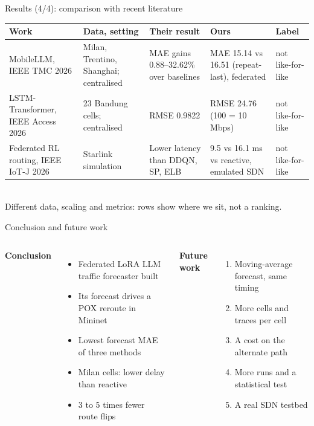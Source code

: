 \documentclass[11pt,aspectratio=169]{beamer}
\begin{document}
\begin{frame}{Results (4/4): comparison with recent literature}
  \footnotesize
  \setlength\tabcolsep{3pt}\renewcommand{\arraystretch}{1.2}
  \begin{tabular}{@{}>{\raggedright}p{2.7cm}>{\raggedright}p{2.8cm}>{\raggedright}p{2.8cm}>{\raggedright}p{3.0cm}>{\raggedright\arraybackslash}p{1.6cm}@{}}
    \toprule
    Work & Data, setting & Their result & Ours & Label\tabularnewline \midrule
    MobileLLM, IEEE TMC 2026 \cite{wang2026mobilellm} & Milan, Trentino, Shanghai; centralised & MAE gains 0.88--32.62\% over baselines & MAE 15.14 vs 16.51 (repeat-last), federated & not like-for-like\tabularnewline
    LSTM-Transformer, IEEE Access 2026 \cite{yuliana2026hybrid} & 23 Bandung cells; centralised & RMSE 0.9822 & RMSE 24.76 (100 = 10 Mbps) & not like-for-like\tabularnewline
    Federated RL routing, IEEE IoT-J 2026 \cite{yang2026hfrl} & Starlink simulation & Lower latency than DDQN, SP, ELB & 9.5 vs 16.1 ms vs reactive, emulated SDN & not like-for-like\tabularnewline
    \bottomrule
  \end{tabular}\\[6pt]
  Different data, scaling and metrics: rows show where we sit, not a ranking.
\end{frame}

\begin{frame}{Conclusion and future work}
  \begin{columns}[T]
    \textbf{Conclusion}
    \begin{itemize}\small
      \item Federated LoRA LLM traffic forecaster built
      \item Its forecast drives a POX reroute in Mininet
      \item Lowest forecast MAE of three methods
      \item Milan cells: lower delay than reactive
      \item 3 to 5 times fewer route flips
    \end{itemize}
    \textbf{Future work}
    \begin{enumerate}\small
      \item Moving-average forecast, same timing
      \item More cells and traces per cell
      \item A cost on the alternate path
      \item More runs and a statistical test
      \item A real SDN testbed
    \end{enumerate}
  \end{columns}
\end{frame}
\end{document}
